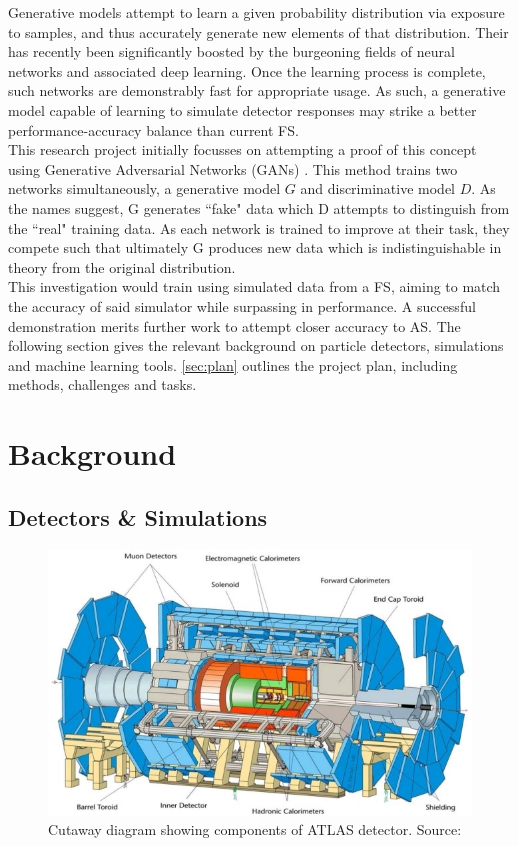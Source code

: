 \documentclass{article}
\begin{document}
Generative models attempt to learn a given probability distribution via exposure to samples, and thus accurately generate new elements of that distribution. Their has recently been significantly boosted by the burgeoning fields of neural networks and associated deep learning. Once the learning process is complete, such networks are demonstrably fast for appropriate usage. As such, a generative model capable of learning to simulate detector responses may strike a better performance-accuracy balance than current FS. \\

This research project initially focusses on attempting a proof of this concept using Generative Adversarial Networks (GANs) \cite{gan1}. This method trains two networks simultaneously, a generative model $G$ and discriminative model $D$. As the names suggest, G generates ``fake" data which D attempts to distinguish from the ``real" training data. As each network is trained to improve at their task, they compete such that ultimately G produces new data which is indistinguishable in theory from the original distribution.\\

This investigation would train using simulated data from a FS, aiming to match the accuracy of said simulator while surpassing in performance. A successful demonstration merits further work to attempt closer accuracy to AS. The following section gives the relevant background on particle detectors, simulations and machine learning tools. \cref{sec:plan} outlines the project plan, including methods, challenges and tasks.

\section{Background}
\label{sec:background}



\subsection{Detectors \& Simulations}
\label{sec:detector}

\begin{figure}[H]
	\centering
	\includegraphics[width=0.6\linewidth]{img/atlasdetector}
	
	\caption{Cutaway diagram showing components of ATLAS detector. Source: \cite{atlaspic}}
	\label{fig:atlaspic}
	
\end{figure}
\end{document}
